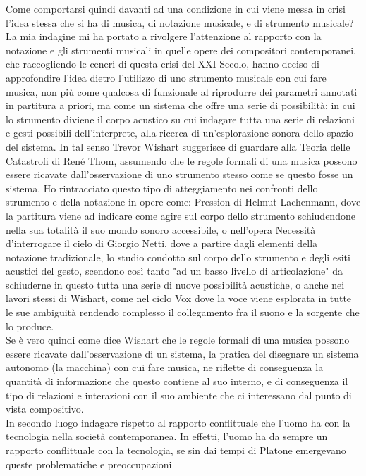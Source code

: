 Come comportarsi quindi davanti ad una condizione in cui viene messa in crisi l'idea stessa
che si ha di musica, di notazione musicale, e di strumento musicale?
La mia indagine mi ha portato a rivolgere l'attenzione al rapporto con la notazione 
e gli strumenti musicali in quelle opere dei compositori contemporanei, 
che raccogliendo le ceneri di questa crisi del XXI Secolo, 
hanno deciso di approfondire l'idea dietro l'utilizzo
di uno strumento musicale con cui fare musica, non più come 
qualcosa di funzionale al riprodurre dei parametri annotati in partitura a priori,
ma come un sistema che offre una serie di possibilità; 
in cui lo strumento diviene il corpo acustico su cui indagare 
tutta una serie di relazioni e gesti possibili dell'interprete, 
alla ricerca di un'esplorazione sonora dello spazio del sistema.
In tal senso Trevor Wishart suggerisce di guardare alla Teoria delle Catastrofi 
di René Thom, assumendo che le regole formali di una musica possono
essere ricavate dall'osservazione di uno strumento stesso come se questo fosse un sistema.
Ho rintracciato questo tipo di atteggiamento nei confronti dello strumento
e della notazione in opere come: Pression di Helmut Lachenmann,
dove la partitura viene ad indicare come agire sul corpo dello strumento
schiudendone nella sua totalità il suo mondo sonoro accessibile,
o nell'opera Necessità d'interrogare il cielo di Giorgio Netti,
dove a partire dagli elementi della notazione tradizionale, lo studio condotto 
sul corpo dello strumento e degli esiti acustici del gesto, scendono così tanto 
"ad un basso livello di articolazione" da schiuderne in questo tutta una serie di nuove possibilità
acustiche, o anche nei lavori stessi di Wishart, come nel ciclo Vox 
dove la voce viene esplorata in tutte le sue ambiguità rendendo
complesso il collegamento fra il suono e la sorgente che lo produce. \\
Se è vero quindi come dice Wishart che le regole formali di una musica possono
essere ricavate dall'osservazione di un sistema, 
la pratica del disegnare un sistema autonomo (la macchina) con cui fare musica,
ne riflette di conseguenza la quantità di informazione che questo contiene al suo interno,
e di conseguenza il tipo di relazioni e interazioni con il suo ambiente che 
ci interessano dal punto di vista compositivo.\\
In secondo luogo indagare rispetto al rapporto conflittuale che l'uomo ha con la tecnologia
nella società contemporanea. 
In effetti, l'uomo ha da sempre un rapporto conflittuale con la tecnologia,
se sin dai tempi di Platone emergevano queste problematiche e preoccupazioni
